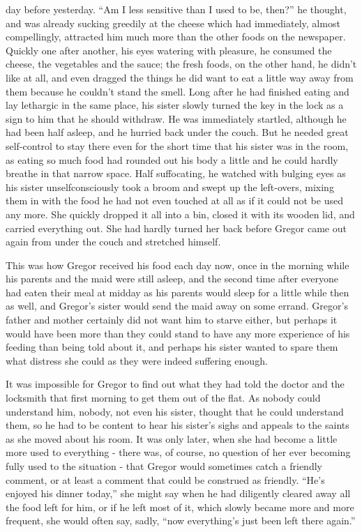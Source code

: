 \documentclass[12pt]{report}
\begin{document}
day before yesterday. ``Am I less sensitive than I used to be, then?''
he thought, and was already sucking greedily at the cheese which had
immediately, almost compellingly, attracted him much more than the other
foods on the newspaper. Quickly one after another, his eyes watering
with pleasure, he consumed the cheese, the vegetables and the sauce; the
fresh foods, on the other hand, he didn't like at all, and even dragged
the things he did want to eat a little way away from them because he
couldn't stand the smell. Long after he had finished eating and lay
lethargic in the same place, his sister slowly turned the key in the
lock as a sign to him that he should withdraw. He was immediately
startled, although he had been half asleep, and he hurried back under
the couch. But he needed great self-control to stay there even for the
short time that his sister was in the room, as eating so much food had
rounded out his body a little and he could hardly breathe in that narrow
space. Half suffocating, he watched with bulging eyes as his sister
unselfconsciously took a broom and swept up the left-overs, mixing them
in with the food he had not even touched at all as if it could not be
used any more. She quickly dropped it all into a bin, closed it with its
wooden lid, and carried everything out. She had hardly turned her back
before Gregor came out again from under the couch and stretched himself.

This was how Gregor received his food each day now, once in the morning
while his parents and the maid were still asleep, and the second time
after everyone had eaten their meal at midday as his parents would sleep
for a little while then as well, and Gregor's sister would send the maid
away on some errand. Gregor's father and mother certainly did not want
him to starve either, but perhaps it would have been more than they
could stand to have any more experience of his feeding than being told
about it, and perhaps his sister wanted to spare them what distress she
could as they were indeed suffering enough.

It was impossible for Gregor to find out what they had told the doctor
and the locksmith that first morning to get them out of the flat. As
nobody could understand him, nobody, not even his sister, thought that
he could understand them, so he had to be content to hear his sister's
sighs and appeals to the saints as she moved about his room. It was only
later, when she had become a little more used to everything - there was,
of course, no question of her ever becoming fully used to the situation
- that Gregor would sometimes catch a friendly comment, or at least a
comment that could be construed as friendly. ``He's enjoyed his dinner
today,'' she might say when he had diligently cleared away all the food
left for him, or if he left most of it, which slowly became more and
more frequent, she would often say, sadly, ``now everything's just been
left there again.''
\end{document}
